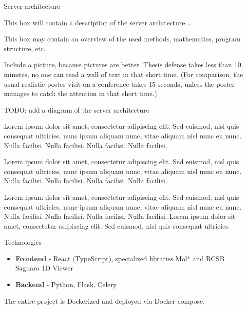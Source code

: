 \documentclass[portrait,a0paper,fontscale=0.25]{baposter}
\begin{document}
\begin{poster}
\begin{posterbox}[column=0, name=architecture, below=goals]{Server architecture}

This box will contain a description of the server architecture \dots

This box may contain an overview of the used methods, mathematics, program structure, etc.

Include a picture, because pictures are better. Thesis defense takes less than 10 minutes, no one can read a wall of text in that short time. (For comparison, the usual realistic poster visit on a conference takes 15 seconds, unless the poster manages to catch the attention in that short time.)

TODO: add a diagram of the server architecture

Lorem ipsum dolor sit amet, consectetur adipiscing elit. Sed euismod, nisl quis
consequat ultricies, nunc ipsum aliquam nunc, vitae aliquam nisl nunc eu
nunc. Nulla facilisi. Nulla facilisi. Nulla facilisi. Nulla facilisi.

Lorem ipsum dolor sit amet, consectetur adipiscing elit. Sed euismod, nisl quis
consequat ultricies, nunc ipsum aliquam nunc, vitae aliquam nisl nunc eu
nunc. Nulla facilisi. Nulla facilisi. Nulla facilisi. Nulla facilisi.

Lorem ipsum dolor sit amet, consectetur adipiscing elit. Sed euismod, nisl quis
consequat ultricies, nunc ipsum aliquam nunc, vitae aliquam nisl nunc eu
nunc. Nulla facilisi. Nulla facilisi. Nulla facilisi. Nulla facilisi.
Lorem ipsum dolor sit amet, consectetur adipiscing elit. Sed euismod, nisl quis
consequat ultricies.


\end{posterbox}

\begin{posterbox}[column=0, name=tech, below=architecture, headerColorOne=yellow!80!orange!95!black, boxColorOne=yellow!33]{Technologies}
\begin{itemize}
	\item \textbf{Frontend} - React (TypeScript), specialized libraries Mol* and RCSB Saguaro 1D Viewer
	\item \textbf{Backend} - Python, Flask, Celery
\end{itemize}
The entire project is Dockerized and deployed via Docker-compose.
\end{posterbox}


\end{poster}
\end{document}
